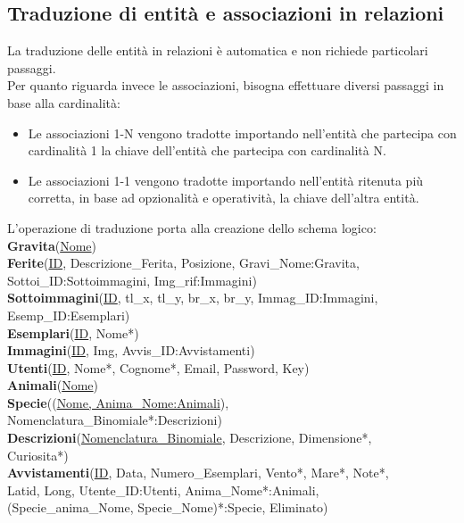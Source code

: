 \documentclass[a4paper,final,12pt]{report}
\newcommand\tab[1][13mm]{\hspace*{#1}}
\begin{document}
\subsection{Traduzione di entità e associazioni in relazioni}
La traduzione delle entità in relazioni è automatica e non richiede particolari passaggi.\\
Per quanto riguarda invece le associazioni, bisogna effettuare diversi passaggi in base alla cardinalità:
\begin{itemize}
\item  Le associazioni 1-N vengono tradotte importando nell'entità che partecipa con cardinalità 1 la chiave dell'entità che partecipa con cardinalità N.
\item Le associazioni 1-1 vengono tradotte importando nell'entità ritenuta più corretta, in base ad opzionalità e operatività, la chiave dell'altra entità.
\end{itemize}

L'operazione di traduzione porta alla creazione dello schema logico:\\
\textbf{Gravita}(\underline{Nome})\\
\textbf{Ferite}(\underline{ID}, Descrizione\_Ferita, Posizione, Gravi\_Nome:Gravita, \\ \tab Sottoi\_ID:Sottoimmagini, Img\_rif:Immagini)\\
\textbf{Sottoimmagini}(\underline{ID}, tl\_x, tl\_y, br\_x, br\_y, Immag\_ID:Immagini,\\ \tab Esemp\_ID:Esemplari)\\
\textbf{Esemplari}(\underline{ID}, Nome*)\\
\textbf{Immagini}(\underline{ID}, Img, Avvis\_ID:Avvistamenti)\\
\textbf{Utenti}(\underline{ID}, Nome*, Cognome*, Email, Password, Key)\\
\textbf{Animali}(\underline{Nome})\\
\textbf{Specie}((\underline{Nome, Anima\_Nome:Animali}),\\ \tab Nomenclatura\_Binomiale*:Descrizioni)\\
\textbf{Descrizioni}(\underline{Nomenclatura\_Binomiale}, Descrizione, Dimensione*,\\ \tab Curiosita*)\\
\textbf{Avvistamenti}(\underline{ID}, Data, Numero\_Esemplari, Vento*, Mare*, Note*,\\ \tab Latid, Long, Utente\_ID:Utenti, Anima\_Nome*:Animali,\\ \tab (Specie\_anima\_Nome, Specie\_Nome)*:Specie, Eliminato)\\
\end{document}
